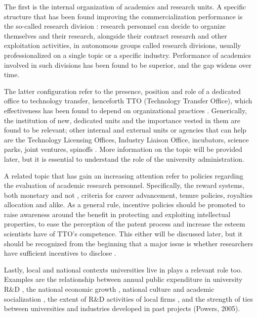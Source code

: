 The first is the internal organization of academics and research units. A specific structure that has been found improving the commercialization performance is the so-called research division \citep{VanLooy2004}: research personnel can decide to organize themselves and their research, alongside their contract research and other exploitation activities, in autonomous groups called research divisions, usually professionalized on a single topic or a specific industry. Performance of academics involved in such divisions has been found to be superior, and the gap widens over time.

The latter configuration refer to the presence, position and role of a dedicated office to technology transfer, henceforth TTO (Technology Transfer Office), which effectiveness has been found to depend on organizational practices \citep{Siegel2003a}. Generically, the institution of new, dedicated units and the importance vested in them are found to be relevant; other internal and external units or agencies that can help are the Technology Licensing Offices, Industry Liaison Office, incubators, science parks, joint ventures, spinoffs \citep{Tijssen2006}. More information on the topic will be provided later, but it is essential to understand the role of the university administration.

A related topic that has gain an increasing attention refer to policies regarding the evaluation of academic research personnel. Specifically, the reward systems, both monetary and not \citep{Guerrero2014}, criteria for career advancement, tenure policies, royalties allocation and alike. As a general rule, incentive policies should be promoted to raise awareness around the benefit in protecting and exploiting intellectual properties, to ease the perception of the patent process and increase the esteem scientists have of TTO's competence. This either will be discussed later, but it should be recognized from the beginning that a major issue is whether researchers have sufficient incentives to disclose \citep{Debackere2005}.

Lastly, local and national contexts universities live in plays a relevant role too. Examples are the relationship between annual public expenditure in university R\&D \citep{OShea2005}, the national economic growth \citep{Siegel2003a}, national culture and academic socialization \citep{Bercovitz2006}, the extent of R\&D activities of local firms \citep{Siegel2003a}, and the strength of ties between universities and industries developed in past projects (Powers, 2005). 

